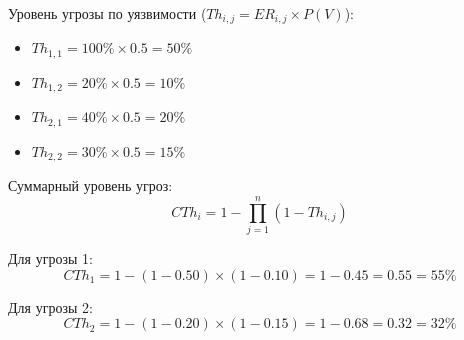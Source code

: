 \documentclass{bsuir}
\begin{document}
Уровень угрозы по уязвимости ($Th_{i,j} = ER_{i,j} \times P(V)$):
\begin{itemize}
	\item $Th_{1,1} = 100\% \times 0.5 = 50\%$
	\item $Th_{1,2} = 20\% \times 0.5 = 10\%$
	\item $Th_{2,1} = 40\% \times 0.5 = 20\%$
	\item $Th_{2,2} = 30\% \times 0.5 = 15\%$
\end{itemize}

Суммарный уровень угроз:
$$CTh_i = 1 - \prod_{j=1}^{n} (1 - Th_{i,j})$$

Для угрозы 1:
$$CTh_1 = 1 - (1 - 0.50) \times (1 - 0.10) = 1 - 0.45 = 0.55 = 55\%$$

Для угрозы 2:
$$CTh_2 = 1 - (1 - 0.20) \times (1 - 0.15) = 1 - 0.68 = 0.32 = 32\%$$
\end{document}

